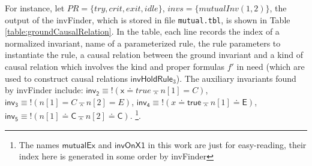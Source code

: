 \documentclass{llncs}
\def \eqc {\doteq }
\def \andc {\barwedge }
\def \negc {!}
\begin{document}
\vspace{-0.8cm}

For instance, let $PR=\{try, crit, exit, idle\}$, $invs=\{mutualInv(1,2)\}$,    the output of the {\sf invFinder}, which is stored in file {\tt mutual.tbl},  is shown in Table
\ref{table:groundCausalRelation}. In the table,  each line records the    index of a normalized   invariant, name of a parameterized rule, the rule
  parameters to instantiate the rule, a causal relation between
  the ground invariant and a kind of causal relation which involves the kind and proper formulas
  $f'$   in need (which are used to construct
      causal relations $\mathsf{invHoldRule}_3$). The auxiliary invariants found by {\sf invFinder} include: $\mathsf{inv_2}  \equiv  \negc (\mathsf{x} \eqc true  \andc  n[1]=C)$, $\mathsf{inv_3}    \equiv \negc  ( n[1]=C \andc n[2]=E)$,
$\mathsf{inv_4}  \equiv  \negc (x \eqc \mathsf{true}  \andc  n[1]\eqc \mathsf{E})$,   $\mathsf{inv_5}    \equiv \negc  ( n[1]\eqc \mathsf{C} \andc n[2] \eqc \mathsf{C})$.  \footnote{The names $\mathsf{mutualEx}$ and $\mathsf{invOnX1}$ in
  this work are just for easy-reading, their
 index here is generated  in some order by {\sf invFinder}}.


\vspace{-0.5cm}
\end{document}
